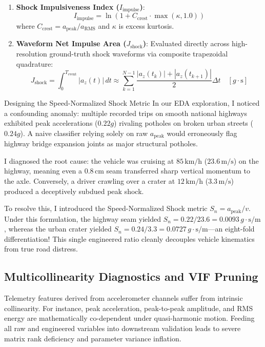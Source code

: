 \begin{enumerate}
    \item \textbf{Shock Impulsiveness Index ($I_{\text{impulse}}$)}:
    \begin{equation}
        I_{\text{impulse}} = \ln\left(1 + C_{\text{crest}} \cdot \max(\kappa, 1.0)\right)
    \end{equation}
    where $C_{\text{crest}} = a_{\text{peak}} / a_{\text{RMS}}$ and $\kappa$ is excess kurtosis.
    
    \item \textbf{Waveform Net Impulse Area ($J_{\text{shock}}$)}:
    Evaluated directly across high-resolution ground-truth shock waveforms via composite trapezoidal quadrature:
    \begin{equation}
        J_{\text{shock}} = \int_0^{T_{\text{event}}} |a_z(t)| \, dt \approx \sum_{k=1}^{N-1} \frac{|a_z(t_k)| + |a_z(t_{k+1})|}{2} \Delta t \quad [g \cdot \text{s}]
    \end{equation}
\end{enumerate}

\begin{designreflection}{Designing the Speed-Normalized Shock Metric}
In our EDA exploration, I noticed a confounding anomaly: multiple recorded trips on smooth national highways exhibited peak accelerations ($0.22g$) rivaling potholes on broken urban streets ($0.24g$). A naive classifier relying solely on raw $a_{\text{peak}}$ would erroneously flag highway bridge expansion joints as major structural potholes. 

I diagnosed the root cause: the vehicle was cruising at $85\,\text{km/h}$ ($23.6\,\text{m/s}$) on the highway, meaning even a $0.8\,\text{cm}$ seam transferred sharp vertical momentum to the axle. Conversely, a driver crawling over a crater at $12\,\text{km/h}$ ($3.3\,\text{m/s}$) produced a deceptively subdued peak shock. 

To resolve this, I introduced the Speed-Normalized Shock metric $S_n = a_{\text{peak}} / v$. Under this formulation, the highway seam yielded $S_n = 0.22 / 23.6 = 0.0093\,g\cdot\text{s/m}$, whereas the urban crater yielded $S_n = 0.24 / 3.3 = 0.0727\,g\cdot\text{s/m}$---an eight-fold differentiation! This single engineered ratio cleanly decouples vehicle kinematics from true road distress.
\end{designreflection}

\subsection{Multicollinearity Diagnostics and VIF Pruning}
Telemetry features derived from accelerometer channels suffer from intrinsic collinearity. For instance, peak acceleration, peak-to-peak amplitude, and RMS energy are mathematically co-dependent under quasi-harmonic motion. Feeding all raw and engineered variables into downstream validation leads to severe matrix rank deficiency and parameter variance inflation.


